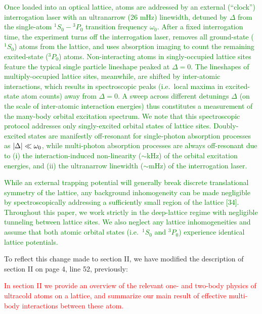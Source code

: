 \documentclass[preprint]{revtex4-1}
\newcommand{\1}{\mathds{1}}
\newcommand{\red}[1]{\textcolor{red}{#1}}
\newcommand{\green}[1]{\textcolor{green}{#1}}
\begin{document}
\begin{enumerate}
  \green{Once loaded into an optical lattice, atoms are addressed by
    an external (``clock'') interrogation laser with an ultranarrow
    (26 mHz) linewidth, detuned by $\Delta$ from the single-atom
    ${}^1S_0-{}^3P_0$ transition frequency $\omega_0$.  After a fixed
    interrogation time, the experiment turns off the interrogation
    laser, removes all ground-state (${}^1S_0$) atoms from the
    lattice, and uses absorption imaging to count the remaining
    excited-state (${}^3P_0$) atoms.  Non-interacting atoms in
    singly-occupied lattice sites feature the typical single particle
    lineshape peaked at $\Delta=0$.  The lineshapes of
    multiply-occupied lattice sites, meanwhile, are shifted by
    inter-atomic interactions, which results in spectroscopic peaks
    (i.e.~local maxima in excited-state atom counts) away from
    $\Delta=0$.  A sweep across different detunings $\Delta$ (on the
    scale of inter-atomic interaction energies) thus constitutes a
    measurement of the many-body orbital excitation spectrum.  We note
    that this spectroscopic protocol addresses only singly-excited
    orbital states of lattice sites.  Doubly-excited states are
    manifestly off-resonant for single-photon absorption processes as
    $\abs{\Delta}\ll\omega_0$, while multi-photon absorption processes
    are always off-resonant due to (i) the interaction-induced
    non-linearity ($\sim$kHz) of the orbital excitation energies, and
    (ii) the ultranarrow linewidth ($\sim$mHz) of the interrogation
    laser.}

  \green{While an external trapping potential will generally break
    discrete translational symmetry of the lattice, any background
    inhomogeneity can be made negligible by spectroscopically
    addressing a sufficiently small region of the lattice [34].
    Throughout this paper, we work strictly in the deep-lattice regime
    with negligible tunneling between lattice sites.  We also neglect
    any lattice inhomogeneities and assume that both atomic orbital
    states (i.e.~${}^1S_0$ and ${}^3P_0$) experience identical lattice
    potentials.}

  To reflect this change made to section II, we have modified the
  description of section II on page 4, line 52, previously:

  \red{In section II we provide an overview of the relevant one- and
    two-body physics of ultracold atoms on a lattice, and summarize
    our main result of effective multi-body interactions between these
    atom.}


\end{enumerate}
\end{document}
